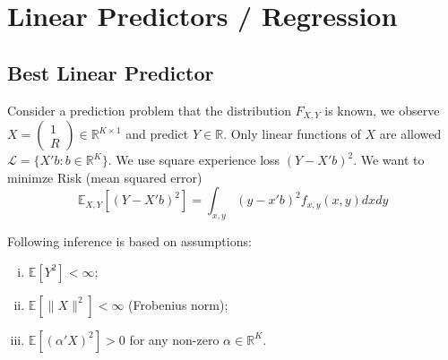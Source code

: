 \documentclass[11pt]{elegantbook}
\begin{document}
\chapter{Linear Predictors / Regression}
\section{Best Linear Predictor}
Consider a prediction problem that the distribution $F_{X,Y}$ is known, we observe $X=\begin{pmatrix}
    1\\
    R
\end{pmatrix}\in \mathbb{R}^{K\times 1}$ and predict $Y\in \mathbb{R}$. Only linear functions of $X$ are allowed $\mathcal{L}=\{X'b:b\in \mathbb{R}^K\}$. We use square experience loss $(Y-X'b)^2$. We want to minimze Risk (mean squared error) $$\mathbb{E}_{X,Y}[(Y-X'b)^2]=\int_{x,y}(y-x'b)^2f_{x,y}(x,y)dxdy$$

\begin{assumption}
    Following inference is based on assumptions:
    \begin{enumerate}[(i).]
        \item $\mathbb{E}[Y^2]<\infty$;
        \item $\mathbb{E}[\|X\|^2]<\infty$ (Frobenius norm);
        \item $\mathbb{E}[(\alpha'X)^2]>0$ for any non-zero $\alpha\in \mathbb{R}^K$.
    \end{enumerate}
\end{assumption}
\end{document}
